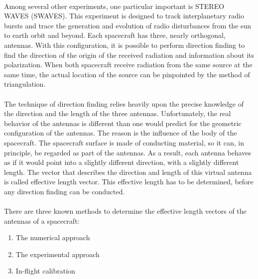 \documentclass[a4paper,10pt]{thesis}
\begin{document}
\paragraph*{}
Among several other experiments, one particular important is STEREO\\
WAVES (SWAVES). This experiment is designed to track interplanetary radio bursts and trace the generation and evolution of radio disturbances from the sun to earth orbit and beyond. Each spacecraft has three, nearly orthogonal, antennas. With this configuration, it is possible to perform direction finding to find the direction of the origin of the received radiation and information about its polarization. When both spacecraft receive radiation from the same source at the same time, the actual location of the source can be pinpointed by the method of triangulation.

\paragraph*{}
The technique of direction finding relies heavily upon the precise knowledge of the direction and the length of the three antennas. Unfortunately, the real behavior of the antennas is different than one would predict for the geometric configuration of the antennas. The reason is the influence of the body of the spacecraft. The spacecraft surface is made of conducting material, so it can, in principle, be regarded as part of the antennas. As a result, each antenna behaves as if it would point into a slightly different direction, with a slightly different length. The vector that describes the direction and length of this virtual antenna is called effective length vector. This effective length has to be determined, before any direction finding can be conducted.

\paragraph*{}
There are three known methods to determine the effective length vectors of the antennas of a spacecraft:

\begin{enumerate}
\item The numerical approach
\item The experimental approach
\item In-flight calibration
\end{enumerate}
\end{document}

